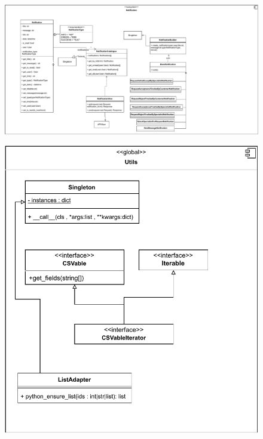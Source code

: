 \begin{figure}[ht!]
	\centering
	\includegraphics[scale=0.8]{figs/design-class/notification.pdf}
\end{figure}
\FloatBarrier
\newpage

\recalctypearea

\begin{figure}[ht!]
	\centering
	\includegraphics[scale=0.8]{figs/design-class/utils.pdf}
\end{figure}
\FloatBarrier
\newpage

